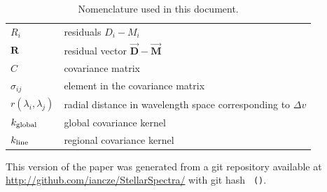 \documentclass[iop,floatfix]{emulateapj}
\newcommand{\fM}{ \vec{{\bm M}}}
\newcommand{\fMi}{M_i}
\newcommand{\fD}{ \vec{{\bm D}}}
\newcommand{\fDi}{D_i}
\newcommand{\fR}{ {\bm R}}
\begin{document}
\begin{table}[!htb]
\begin{tabular}{ll}
$R_i$ & residuals $\fDi - \fMi$\\
$\fR$ & residual vector $\fD - \fM$\\
$C$ & covariance matrix\\
$\sigma_{ij}$ & element in the covariance matrix\\
$r(\lambda_i, \lambda_j)$ & radial distance in wavelength space corresponding to $\Delta v$\\
$k_{\rm global}$ & global covariance kernel\\
$k_{\rm line}$ & regional covariance kernel\\
\hline
\end{tabular}
\caption{Nomenclature used in this document.}
\label{tab:nomenclature}
\end{table}

This version of the paper was generated
 from a git repository available at \url{http://github.com/iancze/StellarSpectra/}
 with git hash \texttt{\githash\,(\gitdate)}.
\end{document}
